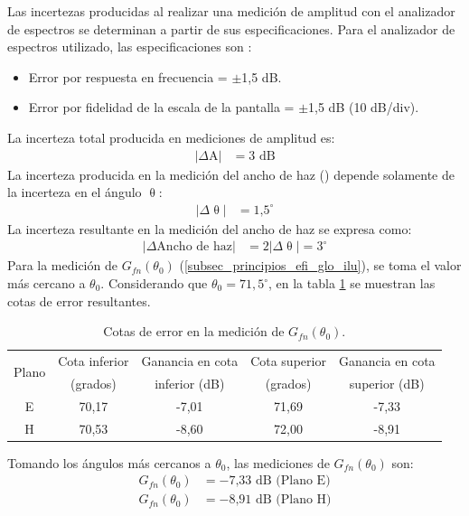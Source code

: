 Las incertezas producidas al realizar una medición de amplitud con el analizador de espectros \cite{Agilent_an_esp_err} se determinan a partir de sus especificaciones. Para el analizador de espectros utilizado, las especificaciones son \cite{LPT_ana_esp_man}:
\begin{itemize}
\item Error por respuesta en frecuencia = $\pm$1,5 dB.
\item Error por fidelidad de la escala de la pantalla = $\pm$1,5 dB (10 dB/div).
\end{itemize}
La incerteza total producida en mediciones de amplitud es:
\begin{align*}
\left|\Delta\text{A}\right| &= 3 \text{ dB}
\end{align*}
La incerteza producida en la medición del ancho de haz () depende solamente de la incerteza en el ángulo $\uptheta$:
\begin{align*}
\left|\Delta\uptheta\right| &= \text{1,5}^{\circ}
\end{align*}
La incerteza resultante en la medición del ancho de haz se expresa como:
\begin{align*}
\left|\Delta\text{Ancho de haz}\right| &= 2\left|\Delta\uptheta\right| = 3^{\circ}
\end{align*}
Para la medición de $G_{fn}\left(\theta_0\right)$ (\ref{subsec_principios_efi_glo_ilu}), se toma el valor más cercano a  $\theta_0$. Considerando que  $\theta_0 = 71,5^{\circ}$, en la tabla \ref{tabla_apE:2} se muestran las cotas de error resultantes.
\begin{table}[H]
\centering
\begin{tabular}{|c|c|c|c|c|}
\hline
\multirow{2}{*}{Plano} & Cota inferior & Ganancia en cota & Cota superior & Ganancia en cota\\
& (grados) & inferior (dB) & (grados) & superior (dB)\\
\hline
E & 70,17 & -7,01 & 71,69 & -7,33\\
\hline
H & 70,53 & -8,60 & 72,00 & -8,91\\
\hline
\end{tabular}
\caption{Cotas de error en la medición de $G_{fn}\left(\theta_0\right)$.}
\label{tabla_apE:2}
\end{table}
Tomando los ángulos más cercanos a $\theta_0$, las mediciones de $G_{fn}\left(\theta_0\right)$ son:
\begin{align*}
G_{fn}\left(\theta_0\right) &= -\text{7,33 dB (Plano E)}\\
G_{fn}\left(\theta_0\right) &= -\text{8,91 dB (Plano H)}
\end{align*}

